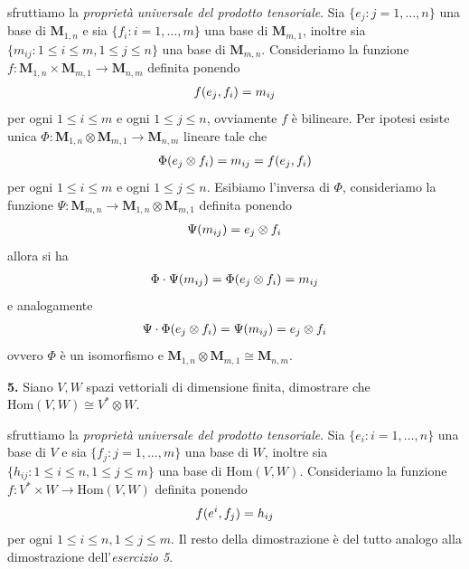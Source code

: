 \documentclass[oneside, 11pt]{amsbook}
\makeatletter
\newcommand{\0}{{(0)}}
\newcommand{\3}{{(3)}}
\theoremstyle{colonplain}
\theoremstyle{colondefinition}
\theoremstyle{colonremark}
\numberwithin{equation}{chapter}
\renewcommand{\proofname}{Dimostrazione}
\renewenvironment{proof}[1][\proofname]{\par
  \pushQED{\qed}%
  \normalfont \topsep6\p@\@plus6\p@\relax
  \trivlist
  \item[\hskip\labelsep\bfseries #1:]\ignorespaces
}{%
  \popQED\endtrivlist\@endpefalse
}
\makeatother
\begin{document}
\begin{proof} sfruttiamo la \textit{proprietà universale del prodotto tensoriale}. Sia $\{ e_j : j = 1, \dots, n \}$ una base di $\mathbf{M}_{1, n}$ e sia $\{ f_i : i = 1, \dots, m \}$ una base di $\mathbf{M}_{m, 1}$, inoltre sia $\{ m_{ij} : 1 \leq i \leq m, 1 \leq j \leq n \}$ una base di $\mathbf{M}_{m, n}$. Consideriamo la funzione $f : \mathbf{M}_{1, n} \times \mathbf{M}_{m, 1} \longrightarrow \mathbf{M}_{n, m}$ definita ponendo
\begin{align}
    f(e_j, f_i) = m_{ij} \notag
\end{align}
per ogni $1 \leq i \leq m$ e ogni $1 \leq j \leq n$, ovviamente $f$ è bilineare. Per ipotesi esiste unica $\Phi : \mathbf{M}_{1, n} \otimes \mathbf{M}_{m, 1} \longrightarrow \mathbf{M}_{n, m}$ lineare tale che
\begin{align}
    \Phi(e_j \otimes f_i) = m_{ij} = f(e_j, f_i) \notag
\end{align}
per ogni $1 \leq i \leq m$ e ogni $1 \leq j \leq n$. Esibiamo l'inversa di $\Phi$, consideriamo la funzione $\Psi : \mathbf{M}_{m, n} \longrightarrow \mathbf{M}_{1, n} \otimes \mathbf{M}_{m, 1}$ definita ponendo
\begin{align}
    \Psi (m_{ij}) = e_j \otimes f_i \notag
\end{align}
allora si ha
\begin{align}
    \Phi \cdot \Psi (m_{ij}) = \Phi(e_j \otimes f_i) = m_{ij} \notag
\end{align}
e analogamente
\begin{align}
    \Psi \cdot \Phi(e_j \otimes f_i) = \Psi(m_{ij}) = e_j \otimes f_i \notag
\end{align}
ovvero $\Phi$ è un isomorfismo e $\mathbf{M}_{1, n} \otimes \mathbf{M}_{m, 1} \cong \mathbf{M}_{n, m}$.


\end{proof}
\textbf{5.} Siano $V, W$ spazi vettoriali di dimensione finita, dimostrare che $\mathrm{Hom}(V, W) \cong V^* \otimes W$. \\

\begin{proof} sfruttiamo la \textit{proprietà universale del prodotto tensoriale}. Sia $\{ e_i : i = 1, \dots, n \}$ una base di $V$ e sia $\{ f_j : j = 1, \dots, m \}$ una base di $W$, inoltre sia $\{ h_{ij} : 1 \leq i \leq n, 1 \leq j \leq m \}$ una base di $\mathrm{Hom}(V, W)$. Consideriamo la funzione $f : V^* \times W \longrightarrow \mathrm{Hom}(V, W)$ definita ponendo
\begin{align}
    f(e^i, f_j) = h_{ij} \notag
\end{align}
per ogni $1 \leq i \leq n, 1 \leq j \leq m$. Il resto della dimostrazione è del tutto analogo alla dimostrazione dell'\textit{esercizio 5}.

\end{proof}
\end{document}

